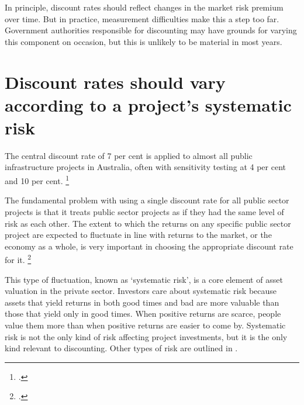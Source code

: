 \documentclass{grattan}
\begin{document}
In principle, discount rates should reflect changes in the market risk premium over time. But in practice, measurement difficulties make this a step too far. Government authorities responsible for discounting may have grounds for varying this component on occasion, but this is unlikely to be material in most years. 















\section{Discount rates should vary according to a project’s systematic risk}\label{subsec:australia-assumes-public-projects-are-as-risky-as-private-projects}

The central discount rate of 7 per cent is applied to almost all public infrastructure projects in Australia, often with sensitivity testing at 4 per cent and 10 per cent.%
    \footcite[][100]{IA-Assessment-Framework-June-2017} 

The fundamental problem with using a single discount rate for all public sector projects is that it treats public sector projects as if they had the same level of risk as each other. The extent to which the returns on any specific public sector project are expected to fluctuate in line with returns to the market, or the economy as a whole, is very important in choosing the appropriate discount rate for it.%
\footcite{Baumol-Social-Rate-of-Discount}

This type of fluctuation, known as `systematic risk', is a core element of asset valuation in the private sector. Investors care about systematic risk because assets that yield returns in both good times and bad are more valuable than those that yield only in good times. When positive returns are scarce, people value them more than when positive returns are easier to come by. Systematic risk is not the only kind of risk affecting project investments, but it is the only kind relevant to discounting. Other types of risk are outlined in .
\end{document}
